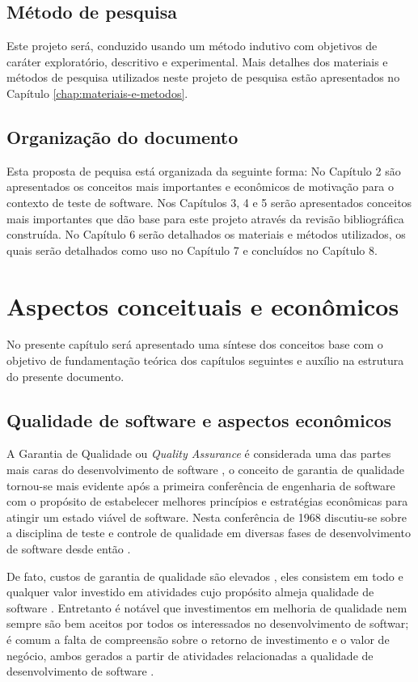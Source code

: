 \documentclass[
	12pt,				%
	oneside,			%
	a4paper,			%
	english,			%
	brazil				%
	]{abntex2ppgsi}
\begin{document}
\section{Método de pesquisa}
Este projeto será, conduzido usando um método indutivo com objetivos de caráter exploratório, descritivo e experimental. Mais detalhes dos materiais e métodos de pesquisa utilizados neste projeto de pesquisa estão apresentados no Capítulo \ref{chap:materiais-e-metodos}.

\section{Organização do documento}
Esta proposta de pequisa está organizada da seguinte forma: No Capítulo 2 são apresentados os conceitos mais importantes  e econômicos de motivação para o contexto de teste de software. Nos Capítulos 3, 4 e 5 serão apresentados conceitos mais importantes que dão base para este projeto através da revisão bibliográfica construída. No Capítulo 6 serão detalhados os materiais e métodos utilizados, os quais serão detalhados como uso no Capítulo 7 e concluídos no Capítulo 8.






\chapter{Aspectos conceituais e econômicos}
No presente capítulo será apresentado uma síntese dos conceitos base com o objetivo de fundamentação teórica dos capítulos seguintes e auxílio na estrutura do presente documento.

\section{Qualidade de software e aspectos econômicos}

A Garantia de Qualidade ou \textit{Quality Assurance} é considerada uma das partes mais caras do desenvolvimento de software \cite{wagner2005}, o conceito de garantia de qualidade tornou-se mais evidente após a primeira conferência de engenharia de software com o propósito de estabelecer melhores princípios e estratégias econômicas para atingir um estado viável de software. Nesta conferência de 1968 discutiu-se sobre a disciplina de teste e controle de qualidade em diversas  fases de desenvolvimento de software desde então \cite{repasi2009}.

De fato, custos de garantia de qualidade são elevados \cite{wagner2005} \cite{Korel1990}, eles consistem em todo e qualquer valor investido em atividades cujo propósito almeja qualidade de software \cite{pressman2009engenharia}. Entretanto é notável que investimentos em melhoria de qualidade nem sempre são bem aceitos por todos os interessados no desenvolvimento de softwar; é comum a falta de compreensão sobre o retorno de investimento e o valor de negócio, ambos gerados a partir de atividades relacionadas a qualidade de desenvolvimento de software \cite{slaughter1998}.
\end{document}
